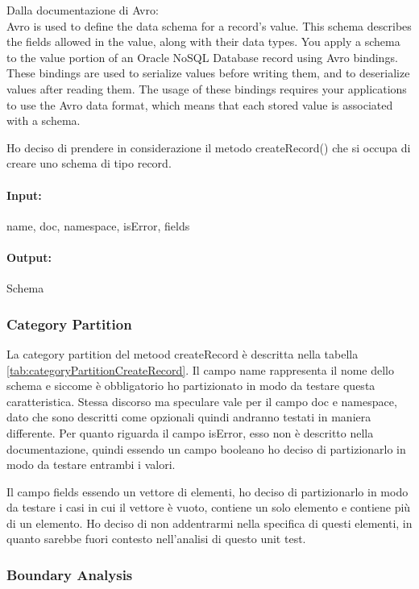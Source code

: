 \documentclass[12pt, a4paper]{article}
\begin{document}
Dalla documentazione di Avro: \\

Avro is used to define the data schema for a record's value. 
This schema describes the fields allowed in the value, along with their data types.
You apply a schema to the value portion of an Oracle NoSQL Database record using Avro bindings.
These bindings are used to serialize values before writing them, and to deserialize values after reading them.
The usage of these bindings requires your applications to use the Avro data format, which means that each
stored value is associated with a schema. 

Ho deciso di prendere in considerazione il metodo createRecord() che si occupa di creare uno schema di tipo record.
\paragraph{Input:} name, doc, namespace, isError, fields

\paragraph{Output:} Schema

\subsubsection{Category Partition}



La category partition del metood createRecord è descritta nella tabella \ref{tab:categoryPartitionCreateRecord}.
Il campo name rappresenta il nome dello schema e siccome è obbligatorio ho partizionato in modo da testare questa caratteristica.
Stessa discorso ma speculare vale per il campo doc e namespace, dato che sono descritti come opzionali 
quindi andranno testati in maniera differente.
Per quanto riguarda il campo isError, esso non è descritto nella documentazione, quindi essendo un campo booleano
ho deciso di partizionarlo in modo da testare entrambi i valori.

Il campo fields essendo un vettore di elementi, ho deciso di partizionarlo in modo da testare i casi in cui il vettore
è vuoto, contiene un solo elemento e contiene più di un elemento. Ho deciso di non addentrarmi nella specifica di 
questi elementi, in quanto sarebbe fuori contesto nell'analisi di questo unit test.
\subsubsection{Boundary Analysis}
\end{document}
